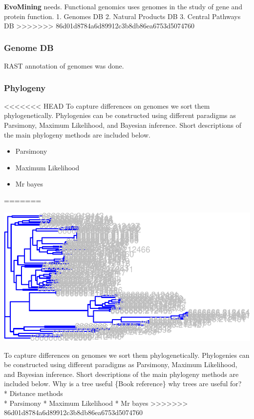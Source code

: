 \documentclass[12pt,twoside]{reedthesis}
\providecommand{\tightlist}{%
  \setlength{\itemsep}{0pt}\setlength{\parskip}{0pt}}
\begin{document}
  \textbf{EvoMining} needs. Functional genomics uses genomes in the study
  of gene and protein function\protect\hyperlink{section}{}. 1. Genomes DB
  2. Natural Products DB 3. Central Pathways DB
>>>>>>> 86d01d8784a6d89912c3b8db86ea6753d5074760
  
  \subsubsection{Genome DB}\label{genome-db}
  
  RAST annotation of genomes was done.
  
  \subsubsection{Phylogeny}\label{phylogeny}
  
<<<<<<< HEAD
  To capture differences on genomes we sort them phylogenetically.
  Phylogenies can be constructed using different paradigms as Parsimony,
  Maximum Likelihood, and Bayesian inference. Short descriptions of the
  main phylogeny methods are included below.
  
  \begin{itemize}
  \tightlist
  \item
    Parsimony
  \item
    Maximum Likelihood
  \item
    Mr bayes
  \end{itemize}
=======
  \begin{center}\includegraphics{tesis_files/figure-latex/testingPhylogeny-1} \end{center}
  
  To capture differences on genomes we sort them phylogenetically.
  Phylogenies can be constructed using different paradigms as Parsimony,
  Maximum Likelihood, and Bayesian inference. Short descriptions of the
  main phylogeny methods are included below. Why is a tree useful \{Book
  reference\} why trees are useful for?\\
  * Distance methods\\
  * Parsimony * Maximum Likelihood * Mr bayes
>>>>>>> 86d01d8784a6d89912c3b8db86ea6753d5074760
  
\end{document}
